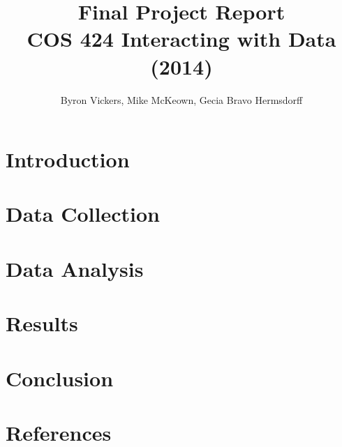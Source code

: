 \documentclass[10pt]{article}
\author{Byron Vickers, Mike McKeown, Gecia Bravo Hermsdorff}
\title{Final Project Report \\ {\Large COS 424 Interacting with Data (2014)} }
\date{}
\begin{document}

\maketitle

\section{Introduction}


\section{Data Collection}


\section{Data Analysis}


\section{Results}


\section{Conclusion}


\section{References}

\end{document}
